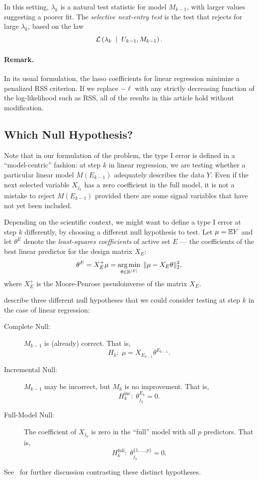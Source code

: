 \documentclass{article}
\begin{document}
In this setting, $\lambda_k$ is a natural test statistic for model $M_{k-1}$, with larger values suggesting a poorer fit. The {\em selective next-entry test} is the test that rejects for large $\lambda_k$, based on the law
\begin{equation*}
\mathcal{L}\left(\lambda_k \;\mid\; U_{k-1}, M_{k-1}\right).
\end{equation*}

\paragraph{Remark.} In its usual formulation, the lasso coefficients for linear regression minimize a penalized RSS criterion. If we replace $-\ell$ with any strictly decreasing function of the log-likelihood such as RSS, all of the results in this article hold without modification.


\subsection{Which Null Hypothesis?}
\label{sec:whichnull}

Note that in our formulation of the problem, the type I error  is defined in a ``model-centric'' fashion: at step $k$ in linear regression, we are testing  whether a particular linear model $M(E_{k-1})$ adequately describes the data $Y$. Even if the next selected variable $X_{j_k}$ has a zero coefficient in the full model, it is not a mistake to reject $M(E_{k-1})$ provided there are some signal variables that have not yet been included.

Depending on the scientific context, we might want to define a type I error at step $k$ differently, by choosing a different null hypothesis to test. Let $\mu = \mathbb{E} Y$ and let $\theta^E$ denote the {\em least-squares coefficients} of active set $E$ --- the coefficients of the best linear predictor for the design matrix $X_E$:
\[
\theta^E = X_E^+ \mu = \operatorname*{arg\,min}_{\theta\in \mathbb{R}^{|E|}} \; \|\mu - X_E\theta\|_2^2,
\]
where $X_E^+$ is the Moore-Penrose pseudoinverse of the matrix $X_E$.

\citet{gsell2013sequential} describe three different null hypotheses that we could consider testing at step $k$ in the case of linear regression:
\begin{description}
\item[Complete Null:] $M_{k-1}$ is (already) correct. That is, 
\[
H_k:\;\mu = X_{E_{k-1}} \theta^{E_{k-1}}.
\]
\item[Incremental Null:] $M_{k-1}$ may be incorrect, but $M_k$ is no improvement. That is, 
\[
H_k^{\text{inc}}:\; \theta_{j_k}^{E_k} = 0.
\]
\item[Full-Model Null:] The coefficient of $X_{j_k}$ is zero in the ``full'' model with all $p$ predictors. That is,
\[
H_k^{\text{full}}:\; \theta_{j_k}^{\{1,\ldots,p\}} = 0.
\]
\end{description}
See~\citet{gsell2013false} for further discussion contrasting these distinct hypotheses.
\end{document}
